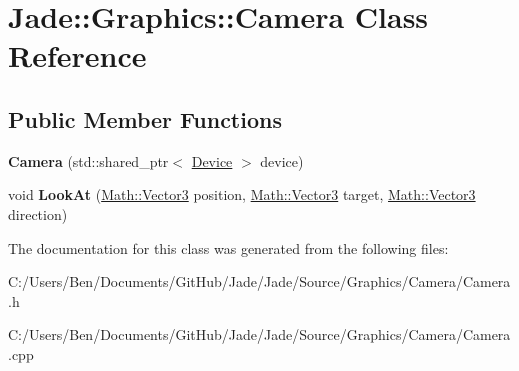 \hypertarget{class_jade_1_1_graphics_1_1_camera}{}\section{Jade\+:\+:Graphics\+:\+:Camera Class Reference}
\label{class_jade_1_1_graphics_1_1_camera}
\subsection*{Public Member Functions}
\begin{DoxyCompactItemize}
\item 
\hypertarget{class_jade_1_1_graphics_1_1_camera_afde4506f9546df500a78a343877f8b24}{}{\bfseries Camera} (std\+::shared\+\_\+ptr$<$ \hyperlink{class_jade_1_1_graphics_1_1_device}{Device} $>$ device)\label{class_jade_1_1_graphics_1_1_camera_afde4506f9546df500a78a343877f8b24}

\item 
\hypertarget{class_jade_1_1_graphics_1_1_camera_a2d1efb3b8364a7c8fd463979cbacef64}{}void {\bfseries Look\+At} (\hyperlink{struct_jade_1_1_math_1_1_vector3}{Math\+::\+Vector3} position, \hyperlink{struct_jade_1_1_math_1_1_vector3}{Math\+::\+Vector3} target, \hyperlink{struct_jade_1_1_math_1_1_vector3}{Math\+::\+Vector3} direction)\label{class_jade_1_1_graphics_1_1_camera_a2d1efb3b8364a7c8fd463979cbacef64}

\end{DoxyCompactItemize}


The documentation for this class was generated from the following files\+:\begin{DoxyCompactItemize}
\item 
C\+:/\+Users/\+Ben/\+Documents/\+Git\+Hub/\+Jade/\+Jade/\+Source/\+Graphics/\+Camera/Camera.\+h\item 
C\+:/\+Users/\+Ben/\+Documents/\+Git\+Hub/\+Jade/\+Jade/\+Source/\+Graphics/\+Camera/Camera.\+cpp\end{DoxyCompactItemize}
